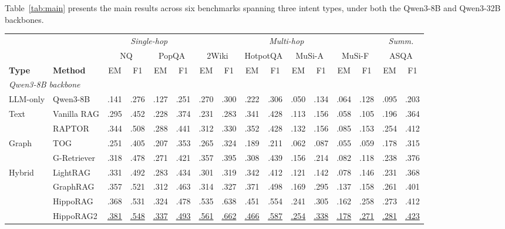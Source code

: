 \documentclass[11pt,a4paper]{article}
\newcommand{\second}[1]{\underline{#1}}
\begin{document}
Table~\ref{tab:main} presents the main results across six benchmarks spanning three intent types, under both the Qwen3-8B and Qwen3-32B backbones.

\begin{table}[t]
\centering
\footnotesize
\setlength{\tabcolsep}{2.7pt}
\begin{tabular}{@{}ll cccc cccccccc cc@{}}
\toprule
 & & \multicolumn{4}{c}{\textit{Single-hop}} & \multicolumn{8}{c}{\textit{Multi-hop}} & \multicolumn{2}{c}{\textit{Summ.}} \\
\cmidrule(lr){3-6}\cmidrule(lr){7-14}\cmidrule(lr){15-16}
 & & \multicolumn{2}{c}{NQ} & \multicolumn{2}{c}{PopQA} & \multicolumn{2}{c}{2Wiki} & \multicolumn{2}{c}{HotpotQA} & \multicolumn{2}{c}{MuSi-A} & \multicolumn{2}{c}{MuSi-F} & \multicolumn{2}{c}{ASQA} \\
\textbf{Type} & \textbf{Method} & EM & F1 & EM & F1 & EM & F1 & EM & F1 & EM & F1 & EM & F1 & EM & F1 \\
\midrule
\multicolumn{16}{l}{\textit{Qwen3-8B backbone}} \\
\midrule
LLM-only & Qwen3-8B      & .141 & .276 & .127 & .251 & .270 & .300 & .222 & .306 & .050 & .134 & .064 & .128 & .095 & .203 \\
\midrule
\multirow{2}{*}{Text}    & Vanilla RAG   & .295 & .452 & .228 & .374 & .231 & .283 & .341 & .428 & .113 & .156 & .058 & .105 & .196 & .364 \\
                         & RAPTOR        & .344 & .508 & .288 & .441 & .312 & .330 & .352 & .428 & .132 & .156 & .085 & .153 & .254 & .412 \\
\midrule
\multirow{2}{*}{Graph}   & TOG           & .251 & .405 & .207 & .353 & .265 & .324 & .189 & .211 & .062 & .087 & .055 & .059 & .178 & .315 \\
                         & G-Retriever   & .318 & .478 & .271 & .421 & .357 & .395 & .308 & .439 & .156 & .214 & .082 & .118 & .238 & .376 \\
\midrule
\multirow{4}{*}{Hybrid}  & LightRAG      & .331 & .492 & .283 & .434 & .301 & .319 & .342 & .412 & .121 & .142 & .078 & .146 & .231 & .368 \\
                         & GraphRAG      & .357 & .521 & .312 & .463 & .314 & .327 & .371 & .498 & .169 & .295 & .137 & .158 & .261 & .401 \\
                         & HippoRAG      & .368 & .531 & .324 & .478 & .535 & .638 & .451 & .554 & .241 & .305 & .162 & .258 & .273 & .412 \\
                         & HippoRAG2     & \second{.381} & \second{.548} & \second{.337} & \second{.493} & \second{.561} & \second{.662} & \second{.466} & \second{.587} & \second{.254} & \second{.338} & \second{.178} & \second{.271} & \second{.281} & \second{.423} \\

\end{tabular}
\end{table}
\end{document}
